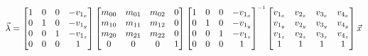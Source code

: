 \begin{align*}
    \vec{\lambda} = 
    \begin{bmatrix}
        1 & 0 & 0 & -v_{1_x} \\
        0 & 1 & 0 & -v_{1_y} \\
        0 & 0 & 1 & -v_{1_z} \\
        0 & 0 & 0 & 1 \\
    \end{bmatrix}
    \begin{bmatrix}
        m_{00} & m_{01} & m_{02} & 0 \\
        m_{10} & m_{11} & m_{12} & 0 \\
        m_{20} & m_{21} & m_{22} & 0 \\
        0      & 0      & 0      & 1 \\
    \end{bmatrix}
    \begin{bmatrix}
        1 & 0 & 0 & -v_{1_x} \\
        0 & 1 & 0 & -v_{1_y} \\
        0 & 0 & 1 & -v_{1_z} \\
        0 & 0 & 0 & 1 \\
    \end{bmatrix}\inverse
    \begin{bmatrix}
        v_{1_x} & v_{2_x} & v_{3_x} & v_{4_x} \\
        v_{1_y} & v_{2_y} & v_{3_y} & v_{4_y} \\
        v_{1_z} & v_{2_z} & v_{3_z} & v_{4_z} \\
        1 & 1 & 1 & 1 \\
    \end{bmatrix}
    \vec{x}
\end{align*}

